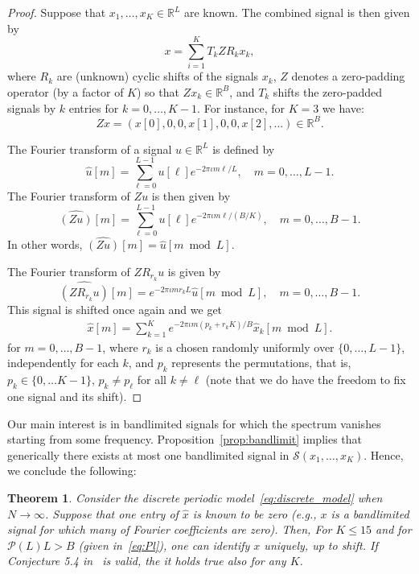 \documentclass[english,12pt]{article}
\newcommand{\I}{\iota}
\newcommand{\R}{\mathbb{R}}
\newcommand{\hx}{\hat{x}}
\newtheorem{thm}{Theorem}
\numberwithin{equation}{section}
\numberwithin{thm}{section} %
\begin{document}
\begin{proof}
Suppose that $x_1,\ldots,x_K\in\R^L$ are known.
The combined signal is then given by 
\begin{equation}
x = \sum_{i=1}^K T_kZR_kx_k,
\end{equation}
where $R_k$ are (unknown) cyclic shifts of the signals $x_k$, $Z$ denotes a zero-padding operator (by a factor of $K$) so that $Zx_k\in\mathbb{R}^B$, and $T_k$ shifts the zero-padded signals by $k$ entries for $k=0,\ldots, K-1$. 
For instance, for $K=3$ we have: 
\begin{equation}
Zx = (x[0],0,0,x[1],0,0,x[2],...)\in\mathbb{R}^B.
\end{equation}

The Fourier transform of a signal $u\in\mathbb{R}^{L}$ is defined by 
\begin{equation}
\hat{u}[m]=\sum_{\ell=0}^{L-1}u[\ell]e^{-2\pi\I m\ell /L}, \quad m=0,\ldots,L-1. 
\end{equation}
The Fourier transform of $Zu$ is then given by 
\begin{equation}
\widehat{(Zu)}[m] = \sum_{\ell=0}^{L-1}u[\ell]e^{-2\pi\I m\ell /(B/K)}, \quad m=0,\ldots,B-1.
\end{equation}
In other words, $\widehat{(Zu)}[m] = \hat{u}[m\bmod L]$.


The Fourier transform of $ZR_{r_k}u$ is  given by 
\begin{equation}
\widehat{(ZR_{r_k}u)}[m] = e^{-2\pi\I m r_k L} \hat{u}[m\bmod L], \quad m=0,\ldots,B-1.
\end{equation}
This signal is shifted once again and we get
\begin{eqnarray} \label{eq:Fourier_structure}
\hat{x}[m] = \sum_{k=1}^K e^{-2\pi\I m( p_k+r_k K)/B} \hat{x}_k[m \bmod L]. 
\end{eqnarray}
for $m=0,\ldots,B-1$, 
where $r_k$ is a chosen randomly uniformly over $\{0,\ldots,L-1\}$, independently for each $k$, and $p_k$ represents the permutations, that is, $p_k\in\{0,\ldots K-1\}$, $p_k\neq p_\ell$ for all $k\neq \ell$ (note that we do have the freedom to fix one signal and its shift). 
\end{proof}
Our main interest is in bandlimited signals for which the spectrum vanishes starting from some frequency. Proposition~\ref{prop:bandlimit} implies that generically there exists at most one bandlimited signal in  $\mathcal{S}(x_1,\ldots,x_K)$.  
Hence, we conclude the following:
\begin{thm} \label{thm:discrete}
Consider the  discrete periodic model~\eqref{eq:discrete_model} when $N\to\infty$. Suppose that one entry of $\hx$ is known to be zero (e.g., $x$ is a bandlimited signal for which many of Fourier coefficients are zero). 
Then, For $K\leq 15$ and for $\mathcal{P}(L)L>B$ (given in~\eqref{eq:Pl}), one can identify $x$ uniquely, up to shift. 
If Conjecture 5.4 in~\cite{bandeira2017estimation} is valid, the it holds true also for any $K$.
\end{thm}
\end{document}
